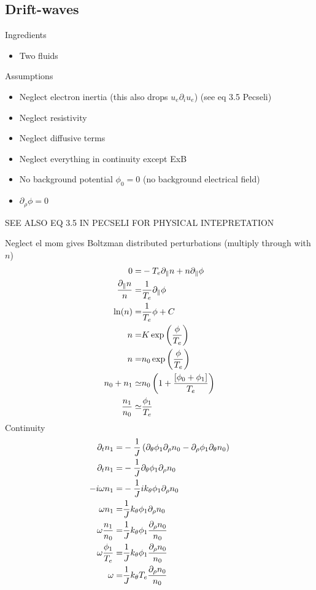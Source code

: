 \subsection{Drift-waves}
Ingredients
%
\begin{itemize}
    \item Two fluids
\end{itemize}
%
Assumptions
\begin{itemize}
    \item Neglect electron inertia (this also drops $u_e \partial_i u_e$) (see eq 3.5 Pecseli)
    \item Neglect resistivity
    \item Neglect diffusive terms
    \item Neglect everything in continuity except ExB
    \item No background potential $\phi_0 = 0$ (no background electrical field)
    \item $\partial_\rho\phi = 0$
\end{itemize}
SEE ALSO EQ 3.5 IN PECSELI FOR PHYSICAL INTEPRETATION

Neglect el mom gives Boltzman distributed perturbations (multiply through with
$n$)
\begin{align*}
    0 =& -T_e\partial_\| n + n\partial_\|\phi\\
    \frac{\partial_\| n}{n} =& \frac{1}{T_e}\partial_\|\phi\\
    \ln(n) =& \frac{1}{T_e}\phi + C\\
    n =& K\exp\left(\frac{\phi }{T_e}\right)\\
    n =& n_0\exp\left(\frac{\phi}{T_e}\right)\\
    n_0 + n_1 \simeq& n_0\left(1 + \frac{[\phi_0 + \phi_1]}{T_e}\right)\\
    \frac{n_1}{n_0} \simeq&  \frac{\phi_1}{T_e}
\end{align*}
Continuity
\begin{align*}
 \partial_t n_1
=&
 -\frac{1}{J}\left(
  \partial_\theta\phi_1\partial_\rho n_0
 - \partial_\rho\phi_1\partial_\theta n_0
 \right)
 \\
 \partial_t n_1
=&
 -\frac{1}{J}
  \partial_\theta\phi_1\partial_\rho n_0
 \\
 -i\omega n_1
=&
 -\frac{1}{J} ik_\theta\phi_1\partial_\rho n_0
 \\
 \omega n_1
=&
 \frac{1}{J} k_\theta\phi_1\partial_\rho n_0
 \\
 \omega \frac{n_1}{n_0}
=&
 \frac{1}{J} k_\theta\phi_1\frac{\partial_\rho n_0}{n_0}
 \\
 \omega \frac{\phi_1}{T_e}
=&
 \frac{1}{J} k_\theta\phi_1\frac{\partial_\rho n_0}{n_0}
 \\
 \omega
=&
 \frac{1}{J}k_\theta T_e \frac{\partial_\rho n_0}{n_0}
\end{align*}

